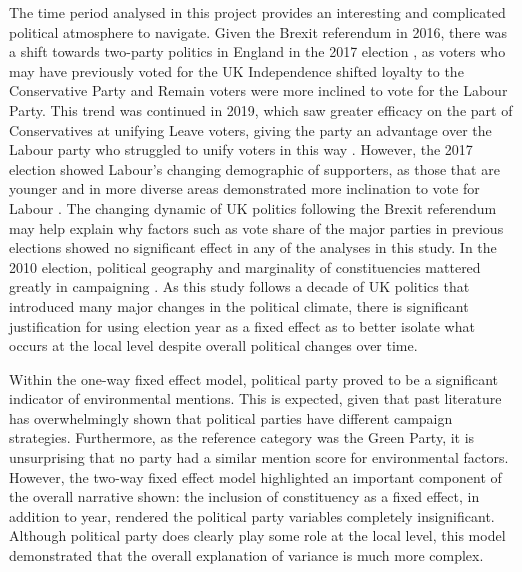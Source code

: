 \documentclass[12pt,letterpaper]{article}
\begin{document}
The time period analysed in this project provides an interesting and complicated political atmosphere to navigate. Given the Brexit referendum in 2016, there was a shift towards two-party politics in England in the 2017 election \autocite{hoboltBrexit2017UK2018,prosserStrangeDeathMultiparty2018}, as voters who may have previously voted for the UK Independence shifted loyalty to the Conservative Party and Remain voters were more inclined to vote for the Labour Party. This trend was continued in 2019, which saw greater efficacy on the part of Conservatives at unifying Leave voters, giving the party an advantage over the Labour party who struggled to unify voters in this way \autocite{cuttsBrexit2019General2020}. However, the 2017 election showed Labour's changing demographic of supporters, as those that are younger and in more diverse areas demonstrated more inclination to vote for Labour \autocite{heath2017GeneralElection2017}. The changing dynamic of UK politics following the Brexit referendum may help explain why factors such as vote share of the major parties in previous elections showed no significant effect in any of the analyses in this study. In the 2010 election, political geography and marginality of constituencies mattered greatly in campaigning \autocite{johnstonLearningElectoralGeography2013}. As this study follows a decade of UK politics that introduced many major changes in the political climate, there is significant justification for using election year as a fixed effect as to better isolate what occurs at the local level despite overall political changes over time.

Within the one-way fixed effect model, political party proved to be a significant indicator of environmental mentions. This is expected, given that past literature has overwhelmingly shown that political parties have different campaign strategies. Furthermore, as the reference category was the Green Party, it is unsurprising that no party had a similar mention score for environmental factors. However, the two-way fixed effect model highlighted an important component of the overall narrative shown: the inclusion of constituency as a fixed effect, in addition to year, rendered the political party variables completely insignificant. Although political party does clearly play some role at the local level, this model demonstrated that the overall explanation of variance is much more complex.
\end{document}
